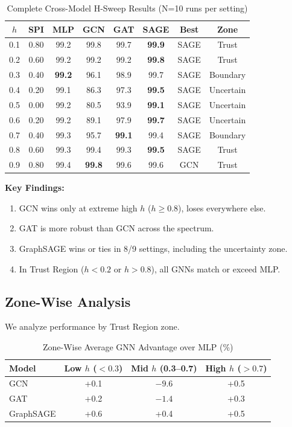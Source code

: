 \begin{table}[t]
\centering
\caption{Complete Cross-Model H-Sweep Results (N=10 runs per setting)}
\label{tab:full_hsweep}
\begin{tabular}{@{}cccccccc@{}}
\toprule
$h$ & SPI & MLP & GCN & GAT & SAGE & Best & Zone \\
\midrule
0.1 & 0.80 & 99.2 & 99.8 & 99.7 & \textbf{99.9} & SAGE & Trust \\
0.2 & 0.60 & 99.2 & 99.2 & 99.2 & \textbf{99.8} & SAGE & Trust \\
0.3 & 0.40 & \textbf{99.2} & 96.1 & 98.9 & 99.7 & SAGE & Boundary \\
0.4 & 0.20 & 99.1 & 86.3 & 97.3 & \textbf{99.5} & SAGE & Uncertain \\
0.5 & 0.00 & 99.2 & 80.5 & 93.9 & \textbf{99.1} & SAGE & Uncertain \\
0.6 & 0.20 & 99.2 & 89.1 & 97.9 & \textbf{99.7} & SAGE & Uncertain \\
0.7 & 0.40 & 99.3 & 95.7 & \textbf{99.1} & 99.4 & SAGE & Boundary \\
0.8 & 0.60 & 99.3 & 99.4 & 99.3 & \textbf{99.5} & SAGE & Trust \\
0.9 & 0.80 & 99.4 & \textbf{99.8} & 99.6 & 99.6 & GCN & Trust \\
\bottomrule
\end{tabular}
\end{table}

\textbf{Key Findings:}
\begin{enumerate}
    \item GCN wins only at extreme high $h$ ($h \geq 0.8$), loses everywhere else.
    \item GAT is more robust than GCN across the spectrum.
    \item GraphSAGE wins or ties in 8/9 settings, including the uncertainty zone.
    \item In Trust Region ($h < 0.2$ or $h > 0.8$), all GNNs match or exceed MLP.
\end{enumerate}

\subsection{Zone-Wise Analysis}

We analyze performance by Trust Region zone.

\begin{table}[t]
\centering
\caption{Zone-Wise Average GNN Advantage over MLP (\%)}
\label{tab:zone_analysis}
\begin{tabular}{@{}lccc@{}}
\toprule
Model & Low $h$ ($<0.3$) & Mid $h$ (0.3--0.7) & High $h$ ($>0.7$) \\
\midrule
GCN & +0.1 & $-9.6$ & +0.5 \\
GAT & +0.2 & $-1.4$ & +0.3 \\
GraphSAGE & +0.6 & +0.4 & +0.5 \\
\bottomrule
\end{tabular}
\end{table}


